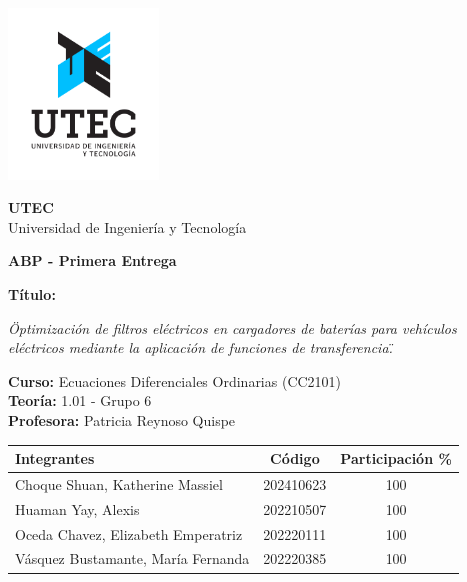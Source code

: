 \begin{titlepage}
    \centering
    
    \includegraphics[width=0.3\textwidth]{utec.png}
    
    \vspace{0.3cm}
    \textbf{UTEC}\\
    Universidad de Ingenier\'ia y Tecnolog\'ia
    
    \vspace{1.5cm}
    
    {\Large\textbf{ABP - Primera Entrega}\par}
    
    \vspace{1cm}
    
    {\bfseries T\'itulo:}\\
    \begin{minipage}{0.9\textwidth}
    \centering
    \textit{\"Optimizaci\'on de filtros el\'ectricos en cargadores de bater\'ias para veh\'iculos el\'ectricos mediante la aplicaci\'on de funciones de transferencia.\"}
    \end{minipage}
    
    \vspace{1cm}
    
    {\bfseries Curso:} Ecuaciones Diferenciales Ordinarias (CC2101)\\
    {\bfseries Teor\'ia:} 1.01 - Grupo 6\\
    {\bfseries Profesora:} Patricia Reynoso Quispe
    
    \vspace{1.5cm}
    
    \renewcommand{\arraystretch}{1.3}
    \begin{center}
    \begin{tabular}{|>{\raggedright\arraybackslash}p{6cm}|c|c|}
    \hline
    \textbf{Integrantes} & \textbf{C\'odigo} & \textbf{Participaci\'on \%} \\
    \hline
    Choque Shuan, Katherine Massiel & 202410623 & 100 \\
    Huaman Yay, Alexis & 202210507 & 100 \\
    Oceda Chavez, Elizabeth Emperatriz & 202220111 & 100 \\
    V\'asquez Bustamante, Mar\'ia Fernanda & 202220385 & 100 \\
    \hline
    \end{tabular}
    \end{center}
    
    \end{titlepage}